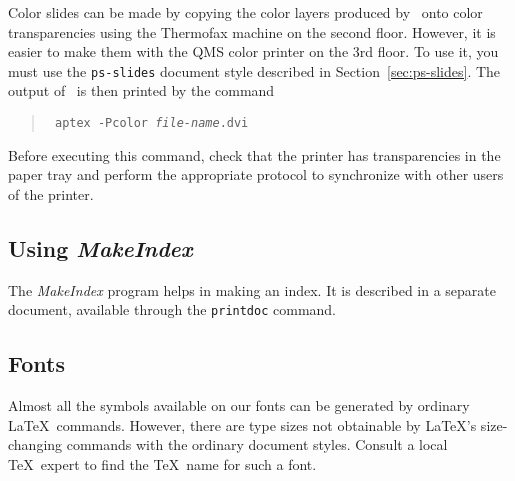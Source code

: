 Color slides can be made by copying the color layers produced by \SLiTeX\
onto color transparencies using the Thermofax machine on the second
floor.  However, it is easier to make them with the QMS color printer 
on the 3rd floor.  To use it, you must use the {\tt ps-slides} 
document style described in Section~\ref{sec:ps-slides}.  The output
of \SLiTeX\ is then printed by the command
\begin{quote} \tt
     aptex -Pcolor {\em file-name}.dvi
\end{quote}
Before executing this command, check that the printer has
transparencies in the paper tray and perform the appropriate protocol
to synchronize with other users of the printer.
 
\subsection{Using {\em MakeIndex\/}} \label{sec:makeindex}
 
The {\em MakeIndex\/} program helps in making an index.  It is 
described in a separate document, available through the
{\tt printdoc} command.
 
 
\subsection{Fonts}
 
Almost all the symbols available on our fonts can be generated by
ordinary \LaTeX\ commands.  However, there are type sizes not
obtainable by \LaTeX's size-changing commands with the ordinary
document styles.  Consult a local \TeX\ expert to find the
\TeX\ name for such a font.
 
